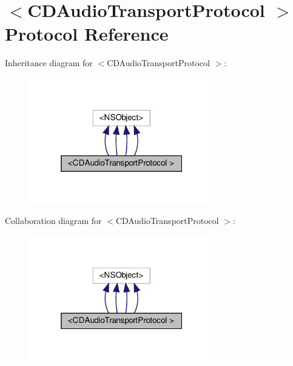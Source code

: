 \hypertarget{protocolCDAudioTransportProtocol_01-p}{}\section{$<$C\+D\+Audio\+Transport\+Protocol $>$ Protocol Reference}
\label{protocolCDAudioTransportProtocol_01-p}


Inheritance diagram for $<$C\+D\+Audio\+Transport\+Protocol $>$\+:
\nopagebreak
\begin{figure}[H]
\begin{center}
\leavevmode
\includegraphics[width=229pt]{protocolCDAudioTransportProtocol_01-p__inherit__graph}
\end{center}
\end{figure}


Collaboration diagram for $<$C\+D\+Audio\+Transport\+Protocol $>$\+:
\nopagebreak
\begin{figure}[H]
\begin{center}
\leavevmode
\includegraphics[width=229pt]{protocolCDAudioTransportProtocol_01-p__coll__graph}
\end{center}
\end{figure}
